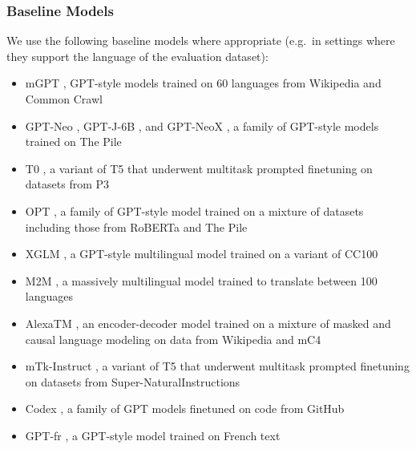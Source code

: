 \documentclass[twoside,11pt]{article}
\begin{document}
\subsubsection{Baseline Models}

We use the following baseline models where appropriate (e.g.\ in settings where they support the language of the evaluation dataset): 
\begin{itemize}
    \item mGPT \citep{shliazhko2022mgpt}, GPT-style models trained on 60 languages from Wikipedia and Common Crawl
    \item GPT-Neo \citep{black2021gpt}, GPT-J-6B \citep{wang2021gpt}, and GPT-NeoX \citep{black2022gpt}, a family of GPT-style models trained on The Pile \citep{gao2020pile}
    \item T0 \citep{sanh2022multitask}, a variant of T5 \citep{raffel2020exploring} that underwent multitask prompted finetuning on datasets from P3 \citep{bach2022promptsource}
    \item OPT \citep{zhang2022opt}, a family of GPT-style model trained on a mixture of datasets including those from RoBERTa \cite{liu2019roberta} and The Pile \citep{gao2020pile}
    \item XGLM \citep{lin2021xglm}, a GPT-style multilingual model trained on a variant of CC100 \citep{conneau2020unsupervised}
    \item M2M \citep{fan-etal-2021-beyond}, a massively multilingual model trained to translate between 100 languages
    \item AlexaTM \citep{soltan-etal-2022-alexatm}, an encoder-decoder model trained on a mixture of masked and causal language modeling on data from Wikipedia and mC4 \citep{xue2021mt5}
    \item mTk-Instruct \citep{wang2022benchmarking}, a variant of T5 that underwent multitask prompted finetuning on datasets from Super-NaturalInstructions
    \item Codex \citep{chen2021evaluating}, a family of GPT models finetuned on code from GitHub
    \item GPT-fr \citep{simoulin:hal-03265900}, a GPT-style model trained on French text
\end{itemize}
\end{document}
